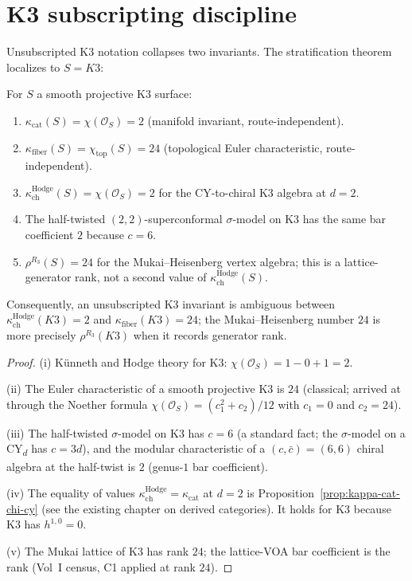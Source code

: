 \section{K3 subscripting discipline}
\label{sec:cy-c-fm119}

Unsubscripted K3 notation collapses two invariants. The stratification
theorem localizes to $S = K3$:

\begin{proposition}
\label{prop:kappa-spectrum-k3}
For $S$ a smooth projective K3 surface:
\begin{enumerate}[label=\textup{(\roman*)}]
 \item $\kappa_{\mathrm{cat}}(S) = \chi(\mathcal{O}_S) = 2$ (manifold invariant, route-independent).
 \item $\kappa_{\mathrm{fiber}}(S) = \chi_{\mathrm{top}}(S) = 24$ (topological Euler characteristic, route-independent).
 \item $\kappa_{\mathrm{ch}}^{\mathrm{Hodge}}(S) = \chi(\mathcal{O}_S) = 2$ for the CY-to-chiral K3 algebra at $d = 2$.
 \item The half-twisted $(2,2)$-superconformal $\sigma$-model on K3 has the same bar coefficient $2$ because $c = 6$.
 \item $\rho^{R_3}(S) = 24$ for the Mukai--Heisenberg vertex algebra; this is a lattice-generator rank, not a second value of $\kappa_{\mathrm{ch}}^{\mathrm{Hodge}}(S)$.
\end{enumerate}
Consequently, an unsubscripted K3 invariant is ambiguous between
$\kappa_{\mathrm{ch}}^{\mathrm{Hodge}}(K3) = 2$ and
$\kappa_{\mathrm{fiber}}(K3) = 24$; the Mukai--Heisenberg number $24$ is more
precisely $\rho^{R_3}(K3)$ when it records generator rank.
\end{proposition}

\begin{proof}
(i) K\"unneth and Hodge theory for K3: $\chi(\mathcal{O}_S) = 1 - 0 + 1 = 2$.

(ii) The Euler characteristic of a smooth projective K3 is $24$ (classical; arrived at through the Noether formula $\chi(\mathcal{O}_S) = (c_1^2 + c_2)/12$ with $c_1 = 0$ and $c_2 = 24$).

(iii) The half-twisted $\sigma$-model on K3 has $c = 6$ (a standard fact; the $\sigma$-model on a CY\textsubscript{$d$} has $c = 3d$), and the modular characteristic of a $(c, \bar c) = (6, 6)$ chiral algebra at the half-twist is $2$ (genus-$1$ bar coefficient).

(iv) The equality of values $\kappa_{\mathrm{ch}}^{\mathrm{Hodge}} = \kappa_{\mathrm{cat}}$ at $d = 2$ is Proposition~\ref{prop:kappa-cat-chi-cy} (see the existing chapter on derived categories). It holds for K3 because K3 has $h^{1,0} = 0$.

(v) The Mukai lattice of K3 has rank $24$; the lattice-VOA bar coefficient is the rank (Vol~I census, C1 applied at rank $24$).
\end{proof}

